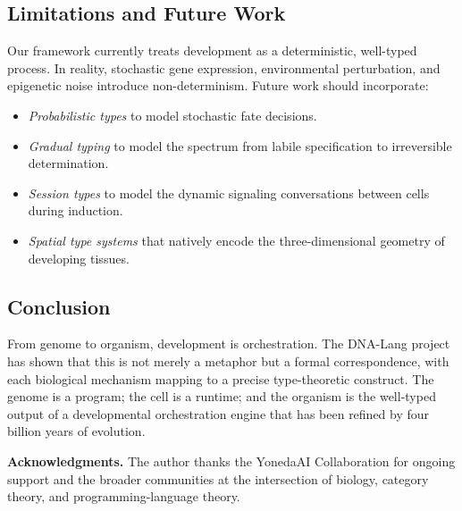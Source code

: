 \documentclass[12pt,a4paper]{article}
\begin{document}
\subsection{Limitations and Future Work}

Our framework currently treats development as a deterministic,
well-typed process.  In reality, stochastic gene expression,
environmental perturbation, and epigenetic noise introduce
non-determinism.  Future work should incorporate:

\begin{itemize}[leftmargin=2em]
  \item \emph{Probabilistic types} to model stochastic fate decisions.
  \item \emph{Gradual typing} to model the spectrum from labile
    specification to irreversible determination.
  \item \emph{Session types} to model the dynamic signaling
    conversations between cells during induction.
  \item \emph{Spatial type systems} that natively encode the
    three-dimensional geometry of developing tissues.
\end{itemize}

\subsection{Conclusion}

From genome to organism, development is orchestration.  The DNA-Lang
project has shown that this is not merely a metaphor but a formal
correspondence, with each biological mechanism mapping to a precise
type-theoretic construct.  The genome is a program; the cell is a
runtime; and the organism is the well-typed output of a developmental
orchestration engine that has been refined by four billion years of
evolution.

\bigskip

\noindent\textbf{Acknowledgments.}
The author thanks the YonedaAI Collaboration for ongoing support
and the broader communities at the intersection of biology, category
theory, and programming-language theory.
\end{document}
